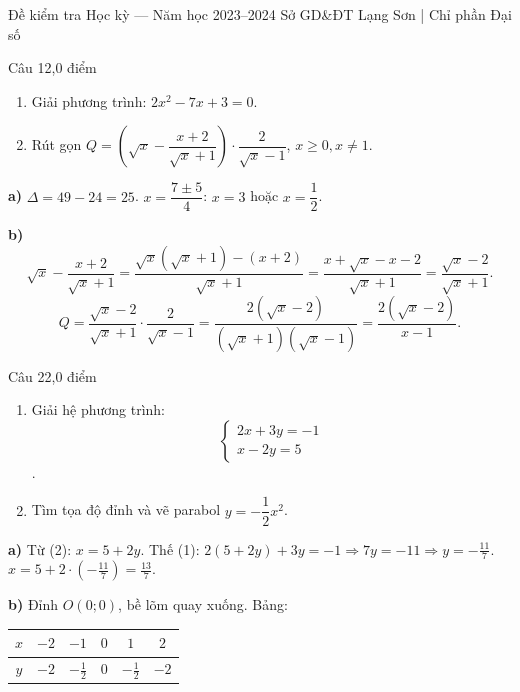 ﻿%
%
  {Đề kiểm tra Học kỳ — Năm học 2023--2024}%
  {Sở GD\&ĐT Lạng Sơn | Chỉ phần Đại số}

\begin{de_cau}{Câu 1}{2,0 điểm}
\begin{enumerate}[label=\alph*)]
\item Giải phương trình: $2x^2 - 7x + 3 = 0$.
\item Rút gọn $Q = \left(\sqrt{x} - \dfrac{x+2}{\sqrt{x}+1}\right) \cdot \dfrac{2}{\sqrt{x}-1}$, $x\geq 0, x\neq 1$.
\end{enumerate}
\end{de_cau}

\begin{loi_giai_cau}
\textbf{a)} $\Delta=49-24=25$. $x=\dfrac{7\pm 5}{4}$: $x=3$ hoặc $x=\dfrac{1}{2}$.

\textbf{b)}
\[\sqrt{x}-\frac{x+2}{\sqrt{x}+1}=\frac{\sqrt{x}(\sqrt{x}+1)-(x+2)}{\sqrt{x}+1}=\frac{x+\sqrt{x}-x-2}{\sqrt{x}+1}=\frac{\sqrt{x}-2}{\sqrt{x}+1}.\]
\[Q=\frac{\sqrt{x}-2}{\sqrt{x}+1}\cdot\frac{2}{\sqrt{x}-1}=\frac{2(\sqrt{x}-2)}{(\sqrt{x}+1)(\sqrt{x}-1)}=\frac{2(\sqrt{x}-2)}{x-1}.\]
\end{loi_giai_cau}

\begin{de_cau}{Câu 2}{2,0 điểm}
\begin{enumerate}[label=\alph*)]
\item Giải hệ phương trình: 
\[ \begin{cases}2x+3y=-1\\x-2y=5\end{cases} \].
\item Tìm tọa độ đỉnh và vẽ parabol $y=-\dfrac{1}{2}x^2$.
\end{enumerate}
\end{de_cau}

\begin{loi_giai_cau}
\textbf{a)} Từ (2): $x=5+2y$. Thế (1): $2(5+2y)+3y=-1\Rightarrow 7y=-11\Rightarrow y=-\frac{11}{7}$.
$x=5+2\cdot(-\frac{11}{7})=\frac{13}{7}$.

\textbf{b)} Đỉnh $O(0;0)$, bề lõm quay xuống. Bảng:
\begin{center}
\begin{tabular}{c|ccccc}$x$&$-2$&$-1$&$0$&$1$&$2$\\\hline$y$&$-2$&$-\frac{1}{2}$&$0$&$-\frac{1}{2}$&$-2$\end{tabular}
\end{center}
\end{loi_giai_cau}

